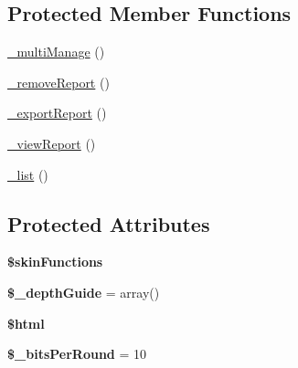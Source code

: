 \subsection*{Protected Member Functions}
\begin{DoxyCompactItemize}
\item 
\hyperlink{classadmin__core__templates__skindiff_a0e1a504ff91c5c414e9aafbbda1507eb}{\-\_\-multi\-Manage} ()
\item 
\hyperlink{classadmin__core__templates__skindiff_a7be787bf85d95dc20d4b13ad16ad8150}{\-\_\-remove\-Report} ()
\item 
\hyperlink{classadmin__core__templates__skindiff_a742771c83e54494702e58058a7ec22da}{\-\_\-export\-Report} ()
\item 
\hyperlink{classadmin__core__templates__skindiff_ae4bbaef4f11dceffb725f25d3aead344}{\-\_\-view\-Report} ()
\item 
\hyperlink{classadmin__core__templates__skindiff_a95d6cc3dd5b48ec4d109375ece1e70c9}{\-\_\-list} ()
\end{DoxyCompactItemize}
\subsection*{Protected Attributes}
\begin{DoxyCompactItemize}
\item 
\hypertarget{classadmin__core__templates__skindiff_a41d90687021c6f16184b43666509dee8}{{\bfseries \$skin\-Functions}}\label{classadmin__core__templates__skindiff_a41d90687021c6f16184b43666509dee8}

\item 
\hypertarget{classadmin__core__templates__skindiff_a34861d67570799fc8f5d4e2ebefcfc7b}{{\bfseries \$\-\_\-depth\-Guide} = array()}\label{classadmin__core__templates__skindiff_a34861d67570799fc8f5d4e2ebefcfc7b}

\item 
\hypertarget{classadmin__core__templates__skindiff_a6f96e7fc92441776c9d1cd3386663b40}{{\bfseries \$html}}\label{classadmin__core__templates__skindiff_a6f96e7fc92441776c9d1cd3386663b40}

\item 
\hypertarget{classadmin__core__templates__skindiff_aeebbd80cf1e0141bf6d89474252f84fe}{{\bfseries \$\-\_\-bits\-Per\-Round} = 10}\label{classadmin__core__templates__skindiff_aeebbd80cf1e0141bf6d89474252f84fe}

\end{DoxyCompactItemize}


